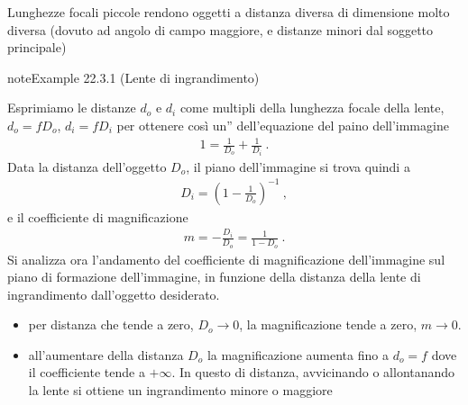 \documentclass[letterpaper,10pt,italian]{jupyterBook}
\begin{document}
\sphinxAtStartPar
{} Lunghezze focali piccole rendono oggetti a distanza diversa di dimensione molto diversa (dovuto ad angolo di campo maggiore, e distanze minori dal soggetto principale)
\label{ch/waves/optics-lens:magnifying-lens}
\begin{sphinxadmonition}{note}{Example 22.3.1 (Lente di ingrandimento)}



\sphinxAtStartPar
Esprimiamo le distanze \(d_o\) e \(d_i\) come multipli della lunghezza focale della lente, \(d_o = f D_o\), \(d_i = f D_i\)  per ottenere così un”{\hyperref[\detokenize{ch/todo:physics-hs-todo-non-dimensional}]{}} dell’equazione del paino dell’immagine
\begin{equation*}
\begin{split}1 = \frac{1}{D_o} + \frac{1}{D_i} \ .\end{split}
\end{equation*}
\sphinxAtStartPar
Data la distanza dell’oggetto \(D_o\), il piano dell’immagine si trova quindi a
\begin{equation*}
\begin{split}D_i = \left( 1 - \frac{1}{D_o} \right)^{-1} \ ,\end{split}
\end{equation*}
\sphinxAtStartPar
e il coefficiente di magnificazione
\begin{equation*}
\begin{split}m = -\frac{D_i}{D_o} = \frac{1}{ 1 - D_o } \ .\end{split}
\end{equation*}
\sphinxAtStartPar
{} Si analizza ora l’andamento del coefficiente di magnificazione dell’immagine sul piano di formazione dell’immagine, in funzione della distanza della lente di ingrandimento dall’oggetto desiderato.
\begin{itemize}
\item {} 
\sphinxAtStartPar
per distanza che tende a zero, \(D_o \rightarrow 0\), la magnificazione tende a zero, \(m \rightarrow 0\).

\item {} 
\sphinxAtStartPar
all’aumentare della distanza \(D_o\) la magnificazione aumenta fino a \(d_o = f\) dove il coefficiente tende a \(+\infty\). In questo di distanza, avvicinando o allontanando la lente si ottiene un ingrandimento minore o maggiore


\end{itemize}
\end{sphinxadmonition}
\end{document}
